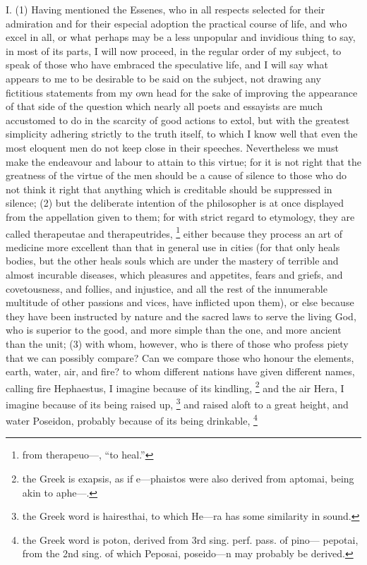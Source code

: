 I. (1) Having mentioned the Essenes, who in all respects selected for their admiration and for their
especial adoption the practical course of life, and who excel in all, or what perhaps may be a less
unpopular and invidious thing to say, in most of its parts, I will now proceed, in the regular order of
my subject, to speak of those who have embraced the speculative life, and I will say what appears
to me to be desirable to be said on the subject, not drawing any fictitious statements from my own
head for the sake of improving the appearance of that side of the question which nearly all poets
and essayists are much accustomed to do in the scarcity of good actions to extol, but with the
greatest simplicity adhering strictly to the truth itself, to which I know well that even the most
eloquent men do not keep close in their speeches. Nevertheless we must make the endeavour and
labour to attain to this virtue; for it is not right that the greatness of the virtue of the men should be
a cause of silence to those who do not think it right that anything which is creditable should be
suppressed in silence; (2) but the deliberate intention of the philosopher is at once displayed from
the appellation given to them; for with strict regard to etymology, they are called therapeutae and
therapeutrides, \footnote{from therapeuo—, ``to heal.''} either because they process an art of medicine more
excellent than that in general use in cities (for that only heals bodies, but the other heals souls
which are under the mastery of terrible and almost incurable diseases, which pleasures and
appetites, fears and griefs, and covetousness, and follies, and injustice, and all the rest of the
innumerable multitude of other passions and vices, have inflicted upon them), or else because they
have been instructed by nature and the sacred laws to serve the living God, who is superior to the
good, and more simple than the one, and more ancient than the unit; (3) with whom, however, who
is there of those who profess piety that we can possibly compare? Can we compare those who
honour the elements, earth, water, air, and fire? to whom different nations have given different
names, calling fire Hephaestus, I imagine because of its kindling, \footnote{the Greek is exapsis, as if e—phaistos
were also derived from aptomai, being akin to aphe—.} and the air Hera, I imagine because of its being raised
up, \footnote{the Greek word is hairesthai, to which He—ra has some similarity in sound.} and raised aloft to a great
height, and water Poseidon, probably because of its being drinkable, \footnote{the Greek word is poton, derived
from 3rd sing. perf. pass. of pino— pepotai, from the 2nd sing. of which Peposai, poseido—n may probably be derived.}
